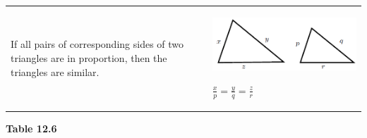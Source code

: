 \begin{center}
\begin{xtabular*}{\mytablewidth}[t]{|p{10\mystarwidth}|p{10\mystarwidth}|}
        If all pairs of corresponding sides of two triangles are in proportion, then the triangles are similar. &
    \setcounter{subfigure}{0}
\label{m39368*id318279}
    \begin{center}
    \label{m39368*id318279!!!underscore!!!media}\label{m39368*id318279!!!underscore!!!printimage}\includegraphics{col11306.imgs/m39368_MG10C13_036.png} %
      \vspace{2pt}
    \vspace{.1in}
    \end{center}    
                    $\frac{x}{p}=\frac{y}{q}=\frac{z}{r}$
     \tabularnewline{}
    \end{xtabular*}
      \end{center}
    \begin{center}{\small\bfseries Table 12.6}\end{center}
    \par
        \label{m39368*uid49}
